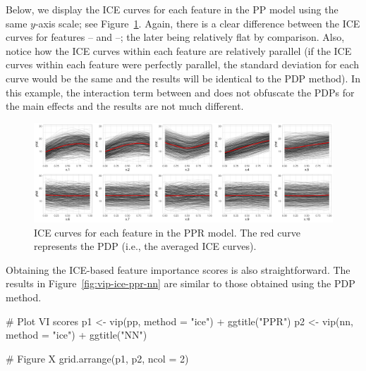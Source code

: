 Below, we display the ICE curves for each feature in the PP model using the same $y$-axis scale; see Figure~\ref{fig:ice-ppr}. Again, there is a clear difference between the ICE curves for features -- and --; the later being relatively flat by comparison. Also, notice how the ICE curves within each feature are relatively parallel (if the ICE curves within each feature were perfectly parallel, the standard deviation for each curve would be the same and the results will be identical to the PDP method). In this example, the interaction term between  and  does not obfuscate the PDPs for the main effects and the results are not much different.


\begin{figure}[!htb]
  \centering 
  \includegraphics[width=1\linewidth]{figures/ice-ppr} 
  \caption{ICE curves for each feature in the PPR model. The red curve represents the PDP (i.e., the averaged ICE curves).}
  \label{fig:ice-ppr}
\end{figure}

Obtaining the ICE-based feature importance scores is also straightforward. The results in Figure~\ref{fig:vip-ice-ppr-nn} are similar to those obtained using the PDP method.

\begin{example}
# Plot VI scores
p1 <- vip(pp, method = "ice") + ggtitle("PPR")
p2 <- vip(nn, method = "ice") + ggtitle("NN")

# Figure X
grid.arrange(p1, p2, ncol = 2)
\end{example}

